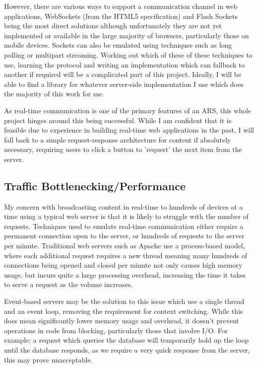 \documentclass[a4papert,11pt,notitlepage]{ltxdoc}
\begin{document}
However, there are various ways to support a  communication channel in web applications, WebSockets (from the HTML5 specification) and Flash Sockets being the most direct solutions although unfortunately they are not yet implemented or available in the large majority of browsers, particularly those on mobile devices. Sockets can also be emulated using techniques such as long polling or multipart streaming. Working out which of these of these techniques to use, learning the protocol and writing an implementation which can fallback to another if required will be a complicated part of this project. Ideally, I will be able to find a library for whatever server-side implementation I use which does the majority of this work for me.

As real-time communication is one of the primary features of an ARS, this whole project hinges around this being successful. While I am confident that it is feasible due to experience in building real-time web applications in the past, I will fall back to a simple request-response architecture for content if absolutely necessary, requiring users to click a button to 'request' the next item from the server.

\subsection{Traffic Bottlenecking/Performance}
\label{sec:performance}
My concern with broadcasting content in real-time to hundreds of devices at a time using a typical web server is that it is likely to struggle with the number of requests. Techniques used to emulate real-time communication either require a permanent connection open to the server, or hundreds of requests to the server per minute. Traditional web servers such as Apache use a process-based model, where each additional request requires a new thread meaning many hundreds of connections being opened and closed per minute not only causes high memory usage, but incurs quite a large processing overhead, increasing the time it takes to serve a request as the volume increases.

Event-based servers may be the solution to this issue which use a single thread and an event loop, removing the requirement for context switching. While this does mean significantly lower memory usage and overhead, it doesn't prevent operations in code from blocking, particularly those that involve I/O. For example; a request which queries the database will temporarily hold up the loop until the database responds, as we require a very quick response from the server, this may prove unacceptable.
\end{document}
